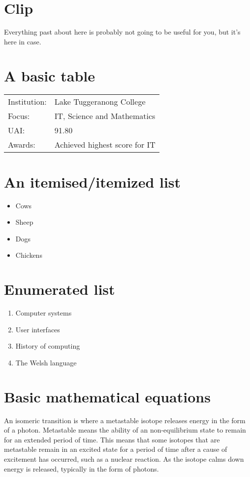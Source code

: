 \documentclass[11pt]{article}
\begin{document}
\section{Clip}
Everything past about here is probably not going to be useful for you, but it's here in case.

\section{A basic table}
\begin{tabular}{p{3.5cm} l}
Institution:		  &Lake Tuggeranong College				\\
Focus:			  &IT, Science and Mathematics			\\
UAI:				  &91.80									\\
Awards:			  &Achieved highest score for IT			\\
\end{tabular}


\section{An itemised/itemized list}
\begin{itemize}
\item Cows
\item Sheep
\item Dogs
\item Chickens
\end{itemize}


\section{Enumerated list}
\begin{enumerate}
\item Computer systems
\item User interfaces
\item History of computing
\item The Welsh language
\end{enumerate}




\section{Basic mathematical equations}
An isomeric transition is where a metastable isotope releases energy in the form of a photon. Metastable means  the ability of an non-equilibrium state to remain for an extended period of time. This means that some isotopes that are metastable remain in an excited state for a period of time after a cause of excitement has occurred, such as a nuclear reaction. As the isotope calms down energy is released, typically in the form of photons.
\end{document}
